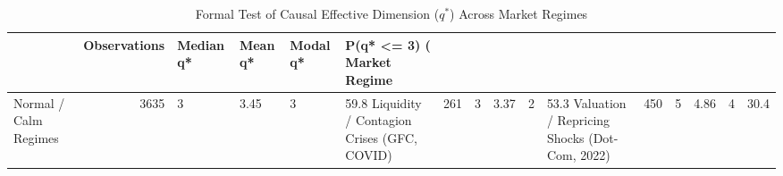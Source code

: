 \begin{table}
\caption{Formal Test of Causal Effective Dimension ($q^*$) Across Market Regimes}
\label{tab:h3_collapse}
\begin{tabular}{lrlllll}
\toprule
 & Observations & Median q* & Mean q* & Modal q* & P(q* <= 3) (%
Market Regime &  &  &  &  &  &  \\
\midrule
Normal / Calm Regimes & 3635 & 3 & 3.45 & 3 & 59.8%
Liquidity / Contagion Crises (GFC, COVID) & 261 & 3 & 3.37 & 2 & 53.3%
Valuation / Repricing Shocks (Dot-Com, 2022) & 450 & 5 & 4.86 & 4 & 30.4%
\bottomrule
\end{tabular}
\end{table}
